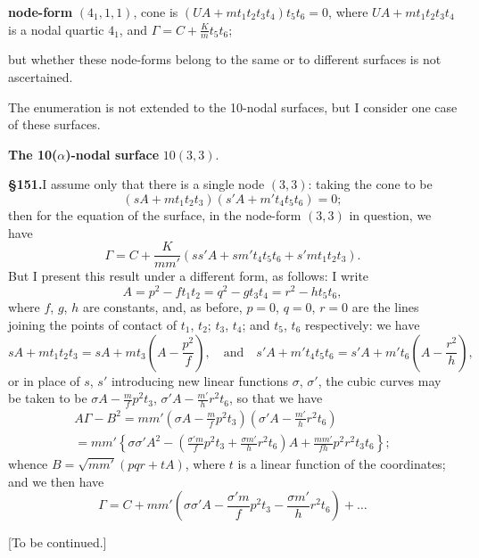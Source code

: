 \documentclass[11pt,a4paper]{article}
\begin{document}
\textbf{node-form} $(4_1, 1, 1)$,
cone is $(UA + mt_1t_2t_3t_4)t_5t_6 = 0$,
where $UA + mt_1t_2t_3t_4$ is a nodal quartic $4_1$,
and $\Gamma = C + \frac{K}{m}t_5t_6$;

but whether these node-forms belong to the same or to different surfaces is not ascertained.

The enumeration is not extended to the 10-nodal surfaces, but I consider one case of these surfaces.

\vspace{0.5em}
\textbf{The 10($\alpha$)-nodal surface} $10(3, 3)$.

\textbf{\S 151.}\quad I assume only that there is a single node $(3, 3)$: taking the cone to be
\[
(sA + mt_1t_2t_3)(s'A + m't_4t_5t_6) = 0;
\]
then for the equation of the surface, in the node-form $(3, 3)$ in question, we have
\[
\Gamma = C + \frac{K}{mm'}(ss'A + sm't_4t_5t_6 + s'mt_1t_2t_3).
\]
But I present this result under a different form, as follows: I write
\[
A = p^2 - ft_1t_2 = q^2 - gt_3t_4 = r^2 - ht_5t_6,
\]
where $f$, $g$, $h$ are constants, and, as before, $p = 0$, $q = 0$, $r = 0$ are the lines joining the points of contact of $t_1$, $t_2$; $t_3$, $t_4$; and $t_5$, $t_6$ respectively: we have
\[
sA + mt_1t_2t_3 = sA + mt_3\left(A - \frac{p^2}{f}\right), \quad\text{and}\quad s'A + m't_4t_5t_6 = s'A + m't_6\left(A - \frac{r^2}{h}\right),
\]
or in place of $s$, $s'$ introducing new linear functions $\sigma$, $\sigma'$, the cubic curves may be taken to be $\sigma A - \frac{m}{f}p^2t_3$, $\sigma'A - \frac{m'}{h}r^2t_6$, so that we have
\begin{multline*}
A\Gamma - B^2 = mm'\left(\sigma A - \frac{m}{f}p^2t_3\right)\left(\sigma'A - \frac{m'}{h}r^2t_6\right) \\
= mm'\left\{\sigma\sigma'A^2 - \left(\frac{\sigma'm}{f}p^2t_3 + \frac{\sigma m'}{h}r^2t_6\right)A + \frac{mm'}{fh}p^2r^2t_3t_6\right\};
\end{multline*}
whence $B = \sqrt{mm'}\left(pqr + tA\right)$, where $t$ is a linear function of the coordinates; and we then have
\[
\Gamma = C + mm'\left(\sigma\sigma'A - \frac{\sigma'm}{f}p^2t_3 - \frac{\sigma m'}{h}r^2t_6\right) + \ldots
\]

\vspace{2em}
\begin{center}
{\small [To be continued.]}
\end{center}
\end{document}
